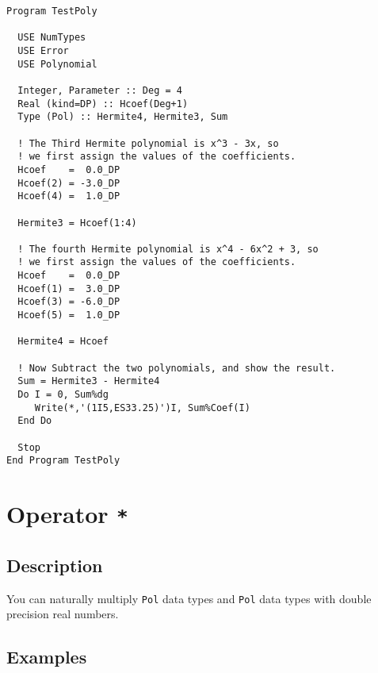 \begin{lstlisting}[emph=Type,
                   emphstyle=\color{blue},
                   frame=trBL,
                   caption=Substracting polynomials.,
                   label=minuspol]
Program TestPoly

  USE NumTypes
  USE Error
  USE Polynomial

  Integer, Parameter :: Deg = 4
  Real (kind=DP) :: Hcoef(Deg+1)
  Type (Pol) :: Hermite4, Hermite3, Sum

  ! The Third Hermite polynomial is x^3 - 3x, so
  ! we first assign the values of the coefficients.
  Hcoef    =  0.0_DP
  Hcoef(2) = -3.0_DP
  Hcoef(4) =  1.0_DP

  Hermite3 = Hcoef(1:4)

  ! The fourth Hermite polynomial is x^4 - 6x^2 + 3, so
  ! we first assign the values of the coefficients.
  Hcoef    =  0.0_DP
  Hcoef(1) =  3.0_DP
  Hcoef(3) = -6.0_DP
  Hcoef(5) =  1.0_DP

  Hermite4 = Hcoef

  ! Now Subtract the two polynomials, and show the result.
  Sum = Hermite3 - Hermite4
  Do I = 0, Sum%dg
     Write(*,'(1I5,ES33.25)')I, Sum%Coef(I)
  End Do

  Stop
End Program TestPoly
\end{lstlisting}

\section{Operator \texttt{*}}

\subsection{Description}

You can naturally multiply \texttt{Pol} data types and \texttt{Pol}
data types with double precision real numbers.

\subsection{Examples}

